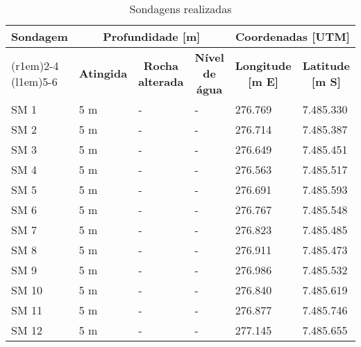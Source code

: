 \begin{table}[htb!]
	\renewcommand{\multirowsetup}{\centering}
	\renewcommand\tabularxcolumn[1]{m{#1}}
	\centering
	\caption{Sondagens realizadas}
	\label{tab:sondspec}
	\begin{tabularx}{\textwidth}{l X X X X X}
		\toprule
		\multirow{3}{*}{\textbf{Sondagem}} & 
		\multicolumn{3}{c}{\textbf{Profundidade [m]}} &
		\multicolumn{2}{c}{\textbf{Coordenadas [UTM]}}\\
		\cmidrule(r{1em}){2-4}
		\cmidrule(l{1em}){5-6}
		&
		\multicolumn{1}{c}{\textbf{Atingida}} &
		\multicolumn{1}{c}{\textbf{Rocha alterada}} &
		\multicolumn{1}{c}{\textbf{Nível de água}} &
		\multicolumn{1}{c}{\textbf{Longitude [m E]}} &
		\multicolumn{1}{c}{\textbf{Latitude [m S]}} \\
		\midrule
SM  1 & 5 m & - & - & 276.769 & 7.485.330\\
SM  2 & 5 m & - & - & 276.714 & 7.485.387\\
SM  3 & 5 m & - & - & 276.649 & 7.485.451\\
SM  4 & 5 m & - & - & 276.563 & 7.485.517\\
SM  5 & 5 m & - & - & 276.691 & 7.485.593\\
SM  6 & 5 m & - & - & 276.767 & 7.485.548\\
SM  7 & 5 m & - & - & 276.823 & 7.485.485\\
SM  8 & 5 m & - & - & 276.911 & 7.485.473\\
SM  9 & 5 m & - & - & 276.986 & 7.485.532\\
SM 10 & 5 m & - & - & 276.840 & 7.485.619\\
SM 11 & 5 m & - & - & 276.877 & 7.485.746\\
SM 12 & 5 m & - & - & 277.145 & 7.485.655\\
		\bottomrule		
	\end{tabularx}
\end{table}

\FloatBarrier
